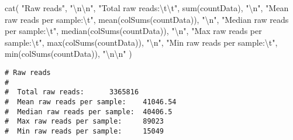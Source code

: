 \documentclass[
]{article}
\newenvironment{Shaded}{\begin{snugshade}}{\end{snugshade}}
\newcommand{\FunctionTok}[1]{\textcolor[rgb]{0.00,0.00,0.00}{#1}}
\newcommand{\NormalTok}[1]{#1}
\newcommand{\SpecialCharTok}[1]{\textcolor[rgb]{0.00,0.00,0.00}{#1}}
\newcommand{\StringTok}[1]{\textcolor[rgb]{0.31,0.60,0.02}{#1}}
\begin{document}
\begin{Shaded}
\begin{Highlighting}[]
\FunctionTok{cat}\NormalTok{(}
  \StringTok{"Raw reads"}\NormalTok{, }\StringTok{"}\SpecialCharTok{\textbackslash{}n\textbackslash{}n}\StringTok{"}\NormalTok{,}
  \StringTok{"Total raw reads:}\SpecialCharTok{\textbackslash{}t\textbackslash{}t}\StringTok{"}\NormalTok{, }\FunctionTok{sum}\NormalTok{(countData), }\StringTok{"}\SpecialCharTok{\textbackslash{}n}\StringTok{"}\NormalTok{,}
  \StringTok{"Mean raw reads per sample:}\SpecialCharTok{\textbackslash{}t}\StringTok{"}\NormalTok{, }\FunctionTok{mean}\NormalTok{(}\FunctionTok{colSums}\NormalTok{(countData)), }\StringTok{"}\SpecialCharTok{\textbackslash{}n}\StringTok{"}\NormalTok{,}
  \StringTok{"Median raw reads per sample:}\SpecialCharTok{\textbackslash{}t}\StringTok{"}\NormalTok{, }\FunctionTok{median}\NormalTok{(}\FunctionTok{colSums}\NormalTok{(countData)), }\StringTok{"}\SpecialCharTok{\textbackslash{}n}\StringTok{"}\NormalTok{,}
  \StringTok{"Max raw reads per sample:}\SpecialCharTok{\textbackslash{}t}\StringTok{"}\NormalTok{, }\FunctionTok{max}\NormalTok{(}\FunctionTok{colSums}\NormalTok{(countData)), }\StringTok{"}\SpecialCharTok{\textbackslash{}n}\StringTok{"}\NormalTok{,}
  \StringTok{"Min raw reads per sample:}\SpecialCharTok{\textbackslash{}t}\StringTok{"}\NormalTok{, }\FunctionTok{min}\NormalTok{(}\FunctionTok{colSums}\NormalTok{(countData)), }\StringTok{"}\SpecialCharTok{\textbackslash{}n\textbackslash{}n}\StringTok{"}
\NormalTok{)}
\end{Highlighting}
\end{Shaded}

\begin{verbatim}
# Raw reads 
# 
#  Total raw reads:      3365816 
#  Mean raw reads per sample:    41046.54 
#  Median raw reads per sample:  40406.5 
#  Max raw reads per sample:     89023 
#  Min raw reads per sample:     15049
\end{verbatim}
\end{document}

